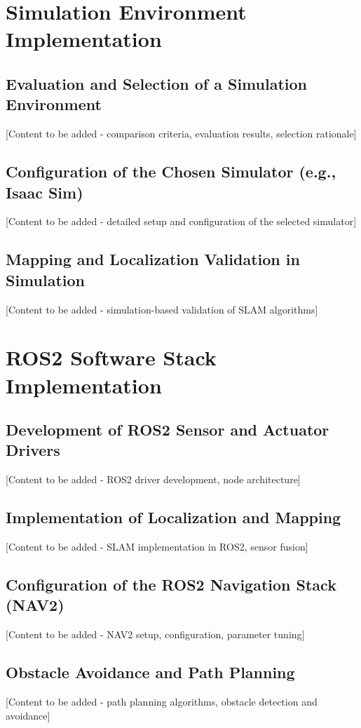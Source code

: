 \vspace{21.5pt}
\chapter{Simulation Environment Implementation}

\section{Evaluation and Selection of a Simulation Environment}

[Content to be added - comparison criteria, evaluation results, selection rationale]

\section{Configuration of the Chosen Simulator (e.g., Isaac Sim)}

[Content to be added - detailed setup and configuration of the selected simulator]

\section{Mapping and Localization Validation in Simulation}

[Content to be added - simulation-based validation of SLAM algorithms]

\vspace{21.5pt}
\chapter{ROS2 Software Stack Implementation}

\section{Development of ROS2 Sensor and Actuator Drivers}

[Content to be added - ROS2 driver development, node architecture]

\section{Implementation of Localization and Mapping}

[Content to be added - SLAM implementation in ROS2, sensor fusion]

\section{Configuration of the ROS2 Navigation Stack (NAV2)}

[Content to be added - NAV2 setup, configuration, parameter tuning]

\section{Obstacle Avoidance and Path Planning}

[Content to be added - path planning algorithms, obstacle detection and avoidance]
